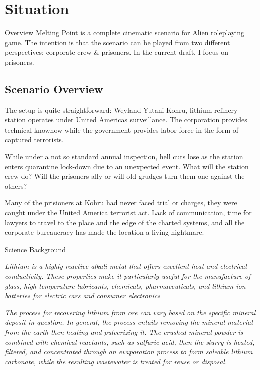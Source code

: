 \chapter{Situation}

\begin{rpg-commentbox}{Overview}
    Melting Point is a complete cinematic scenario for Alien roleplaying game. The intention is that the scenario can be played from two different perspectives: corporate crew \& prisoners. In the current draft, I focus on prisoners.
\end{rpg-commentbox}


\section{Scenario Overview}

The setup is quite straightforward: Weyland-Yutani Kohru, lithium refinery station operates under United Americas surveillance. 
The corporation provides technical knowhow while the government provides labor force in the form of captured terrorists. 


While under a not so standard annual inspection, hell cuts lose as the station enters quarantine lock-down due to an unexpected event.
What will the station crew do? Will the prisoners ally or will old grudges turn them one against the others? 

Many of the prisioners at Kohru had never faced trial or charges, they were caught under the United America terrorist act. Lack of communication, time for lawyers to travel to the place and the edge of the charted systems, and all the corporate bureaucracy has made the location a living nightmare.  




\medskip
\begin{rpg-commentbox}{Science Background}
\begin{small}
\textit{Lithium is a highly reactive alkali metal that offers excellent heat and electrical conductivity.  These properties make it particularly useful for the manufacture of glass, high-temperature lubricants, chemicals, pharmaceuticals, and lithium ion batteries for electric cars and consumer electronics}

\textit{The process for recovering lithium from ore can vary based on the specific mineral deposit in question. In general, the process entails removing the mineral material from the earth then heating and pulverizing it. The crushed mineral powder is combined with chemical reactants, such as sulfuric acid, then the slurry is heated, filtered, and concentrated through an evaporation process to form saleable lithium carbonate, while the resulting wastewater is treated for reuse or disposal.}    
\end{small}
\end{rpg-commentbox}




